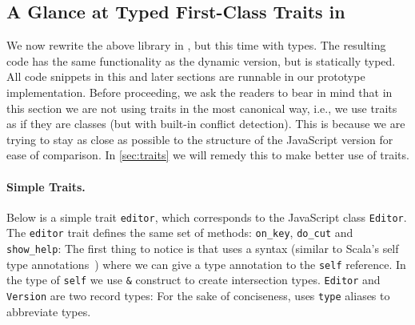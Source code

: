 

\subsection{A Glance at Typed First-Class Traits in \sedel}

We now rewrite the above library in \sedel, but this time with types. The resulting code has the same functionality as the dynamic version, but is
statically typed. All code snippets in this and later sections are runnable in
our prototype implementation. Before proceeding, we ask the readers to bear in mind that in this section we are not using traits
in the most canonical way, i.e., we use traits as if they are classes (but with
built-in conflict detection). This is because we are trying to stay as close as possible
to the structure of the JavaScript version for ease of comparison. In
\cref{sec:traits} we will remedy this to make better use of traits.

\paragraph{Simple Traits.}
Below is a simple trait \lstinline{editor}, which corresponds to the JavaScript
class \lstinline{Editor}. The \lstinline{editor} trait defines the same set of
methods: \lstinline{on_key}, \lstinline{do_cut} and \lstinline{show_help}:
The first thing to notice is that \sedel uses a syntax (similar to Scala's
self type annotations~\cite{odersky2004overview}) where we can give a type annotation to the
\lstinline{self} reference. In the type of \lstinline{self} we use
\lstinline{&} construct to create intersection types. \lstinline{Editor} and \lstinline{Version} are two record types:
For the sake of conciseness, \sedel uses \lstinline{type} aliases to abbreviate types.

